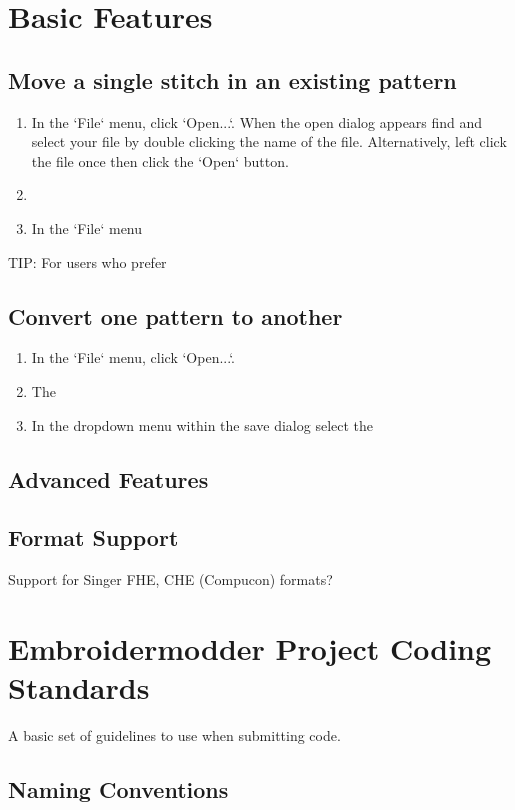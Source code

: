 \documentclass{report}
\begin{document}
\section{Basic Features}

\subsection{Move a single stitch in an existing pattern}

\begin{enumerate}
\item In the `File` menu, click `Open...`. When the open dialog appears find and select your file by double clicking the name of the file. Alternatively, left click the file once then click the `Open` button.
\item
\item In the `File` menu
\end{enumerate}

TIP: For users who prefer

\subsection{Convert one pattern to another}

\begin{enumerate}
\item In the `File` menu, click `Open...`.
\item The
\item In the dropdown menu within the save dialog select the
\end{enumerate}

\subsection{Advanced Features}


\subsection{Format Support}

Support for Singer FHE, CHE (Compucon) formats?

\section{Embroidermodder Project Coding Standards}

A basic set of guidelines to use when submitting code.

\subsection{Naming Conventions}
\end{document}
